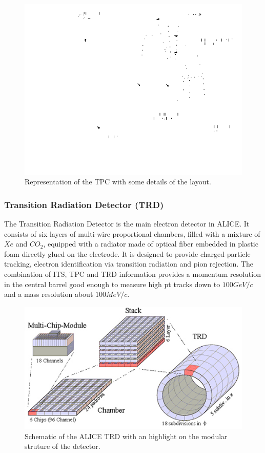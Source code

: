 \begin{figure}[!h]
\begin{center}
\includegraphics[width=0.7\linewidth]{Chapters/Introduction/Figs/tpc.png}
\caption{Representation of the TPC with some details of the layout.}
\label{fig:TPC}
\end{center}
\end{figure}

\subsubsection{Transition Radiation Detector (TRD)}
The Transition Radiation Detector is the main electron detector in ALICE.
It consists of six layers of multi-wire proportional chambers, filled with a mixture of $Xe$ and $CO_2$, equipped with a radiator made of optical fiber embedded in plastic foam directly glued on the electrode.
It is designed to provide charged-particle tracking, electron identification via transition radiation and pion rejection. 
The combination of ITS, TPC and TRD information provides a momentum resolution in the central barrel good enough to measure high pt tracks down to $100 GeV/c$ and a mass resolution about $100 MeV/c$.

\begin{figure}[!h]
\begin{center}
\includegraphics[width=0.7\linewidth]{Chapters/Introduction/Figs/trd.jpg}
\caption{Schematic of the ALICE TRD with an highlight on the modular struture of the detector.}
\label{fig:TRD}
\end{center}
\end{figure}

